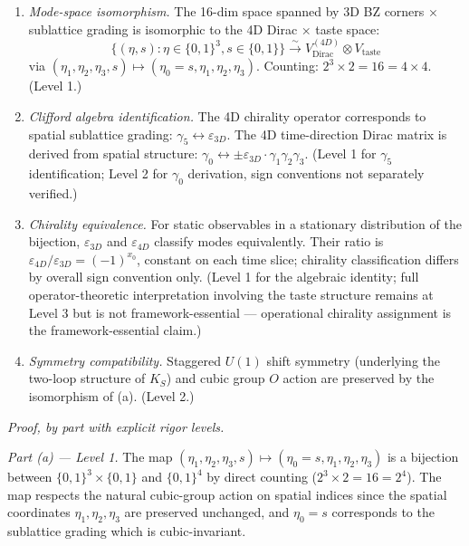 \documentclass[
]{article}
\begin{document}
\begin{enumerate}
\def\labelenumi{(\alph{enumi})}
\item
  \emph{Mode-space isomorphism.} The 16-dim space spanned by 3D BZ
  corners × sublattice grading is isomorphic to the 4D Dirac × taste
  space:
  \[\{(\eta, s) : \eta \in \{0,1\}^3, s \in \{0,1\}\} \xrightarrow{\sim} V_{\text{Dirac}}^{(4D)} \otimes V_{\text{taste}}\]
  via
  \((\eta_1, \eta_2, \eta_3, s) \mapsto (\eta_0 = s, \eta_1, \eta_2, \eta_3)\).
  Counting: \(2^3 \times 2 = 16 = 4 \times 4\). (Level 1.)
\item
  \emph{Clifford algebra identification.} The 4D chirality operator
  corresponds to spatial sublattice grading:
  \(\gamma_5 \leftrightarrow \varepsilon_{3D}\). The 4D time-direction
  Dirac matrix is derived from spatial structure:
  \(\gamma_0 \leftrightarrow \pm \varepsilon_{3D} \cdot \gamma_1\gamma_2\gamma_3\).
  (Level 1 for \(\gamma_5\) identification; Level 2 for \(\gamma_0\)
  derivation, sign conventions not separately verified.)
\item
  \emph{Chirality equivalence.} For static observables in a stationary
  distribution of the bijection, \(\varepsilon_{3D}\) and
  \(\varepsilon_{4D}\) classify modes equivalently. Their ratio is
  \(\varepsilon_{4D}/\varepsilon_{3D} = (-1)^{x_0}\), constant on each
  time slice; chirality classification differs by overall sign
  convention only. (Level 1 for the algebraic identity; full
  operator-theoretic interpretation involving the taste structure
  remains at Level 3 but is not framework-essential --- operational
  chirality assignment is the framework-essential claim.)
\item
  \emph{Symmetry compatibility.} Staggered \(U(1)\) shift symmetry
  (underlying the two-loop structure of \(K_S\)) and cubic group \(O\)
  action are preserved by the isomorphism of (a). (Level 2.)
\end{enumerate}

\emph{Proof, by part with explicit rigor levels.}

\emph{Part (a) --- Level 1.} The map
\((\eta_1, \eta_2, \eta_3, s) \mapsto (\eta_0 = s, \eta_1, \eta_2, \eta_3)\)
is a bijection between \(\{0,1\}^3 \times \{0,1\}\) and \(\{0,1\}^4\) by
direct counting (\(2^3 \times 2 = 16 = 2^4\)). The map respects the
natural cubic-group action on spatial indices since the spatial
coordinates \(\eta_1, \eta_2, \eta_3\) are preserved unchanged, and
\(\eta_0 = s\) corresponds to the sublattice grading which is
cubic-invariant.
\end{document}
